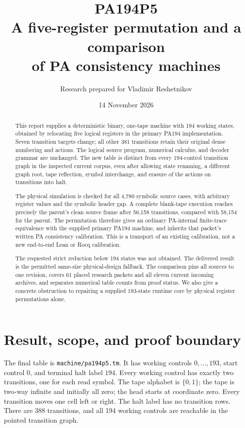 \documentclass[11pt,letterpaper]{article}
\title{\textbf{PA194P5}\\A five-register permutation and a comparison\\of PA consistency machines}
\author{Research prepared for Vladimir Reshetnikov}
\date{14 November 2026}
\newcommand{\file}[1]{\texttt{\nolinkurl{#1}}}
\begin{document}
\maketitle
\begin{abstract}
This report supplies a deterministic binary, one-tape machine with
194 working states, obtained by relocating five logical registers in the
primary PA194 implementation. Seven transition targets change; all other
381 transitions retain their original dense numbering and actions. The
logical source program, numerical calculus, and decoder grammar are
unchanged. The new table is distinct from every 194-control transition
graph in the inspected current corpus, even after allowing state
renaming, a different graph root, tape reflection, symbol interchange,
and erasure of the actions on transitions into halt.

The physical simulation is checked for all 4,780 symbolic source cases,
with arbitrary register values and the symbolic header gap. A complete
blank-tape execution reaches precisely the parent's clean source frame
after 56,158 transitions, compared with 58,154 for the parent. The
permutation therefore gives an ordinary PA-internal finite-trace
equivalence with the supplied primary PA194 machine, and inherits that
packet's written PA consistency calibration. This is a transport of an
existing calibration, not a new end-to-end Lean or Rocq calibration.

The requested strict reduction below 194 states was not obtained.
The delivered result is the permitted same-size physical-design
fallback. The comparison pins all sources to one revision, covers
61 placed research packets and all eleven current incoming archives,
and separates numerical table counts from proof status. We also give
a concrete obstruction to repairing a supplied 193-state runtime core
by physical register permutations alone.
\end{abstract}
\clearpage
\tableofcontents
\clearpage

\section{Result, scope, and proof boundary}

The final table is \file{machine/pa194p5.tm}. It has working controls
$0,\ldots,193$, start control $0$, and terminal halt label $194$.
Every working control has exactly two transitions, one for each read
symbol. The tape alphabet is $\{0,1\}$; the tape is two-way infinite and
initially all zero; the head starts at coordinate zero. Every transition
moves one cell left or right. The halt label has no transition rows.
There are 388 transitions, and all 194 working controls are reachable
in the pointed transition graph.
\end{document}
